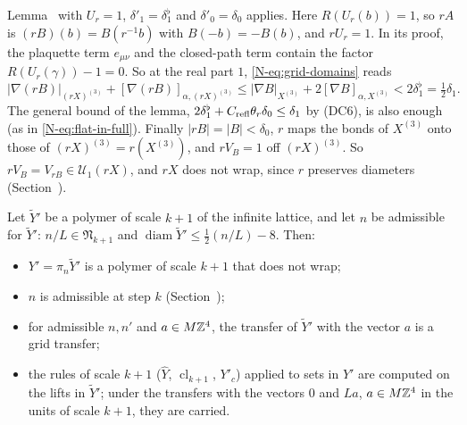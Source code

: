 \begin{step}
Lemma~ with $U_r=1$, $\delta'_1=\delta_1^\flat$ and $\delta'_0=\delta_0$ applies. Here $R(U_r(b))=1$, so $rA$ is $(rB)(b)=B(r^{-1}b)$ with $B(-b)=-B(b)$, and $rU_r=1$. In its proof, the plaquette term $e_{\mu\nu}$ and the closed-path term contain the factor $R(U_r(\gamma))-1=0$. So at the real part $1$, \eqref{N-eq:grid-domains} reads
\[
|\nabla(rB)|_{(rX)^{(3)}}+[\nabla(rB)]_{\alpha,(rX)^{(3)}}\le|\nabla B|_{X^{(3)}}+2[\nabla B]_{\alpha,X^{(3)}}<2\delta_1^\flat=\tfrac12\delta_1 .
\]
The general bound of the lemma, $2\delta_1^\flat+C_{\rm refl}\theta_r\delta_0\le\delta_1$ by (DC6), is also enough (as in \eqref{N-eq:flat-in-full}). Finally $|rB|=|B|<\delta_0$, $r$ maps the bonds of $X^{(3)}$ onto those of $(rX)^{(3)}=r(X^{(3)})$, and $rV_B=1$ off $(rX)^{(3)}$. So $rV_B=V_{rB}\in\mathcal U_1(rX)$, and $rX$ does not wrap, since $r$ preserves diameters (Section~).
\end{step}

\begin{detail}\label{d11b:gl-admissible}
Let $\tilde Y'$ be a polymer of scale $k+1$ of the infinite lattice, and let $n$ be admissible for $\tilde Y'$: $n/L\in\mathfrak N_{k+1}$ and $\operatorname{diam}\tilde Y'\le\frac12(n/L)-8$. Then:
\begin{itemize}
\item[(a)] $Y'=\pi_n\tilde Y'$ is a polymer of scale $k+1$ that does not wrap;
\item[(b)] $n$ is admissible at step $k$ (Section~);
\item[(c)] for admissible $n,n'$ and $a\in M\mathbb Z^4$, the transfer of $\tilde Y'$ with the vector $a$ is a grid transfer;
\item[(d)] the rules of scale $k+1$ ($\hat Y$, $\operatorname{cl}_{k+1}$, $Y'_c$) applied to sets in $Y'$ are computed on the lifts in $\tilde Y'$; under the transfers with the vectors $0$ and $La$, $a\in M\mathbb Z^4$ in the units of scale $k+1$, they are carried.
\end{itemize}
\end{detail}

